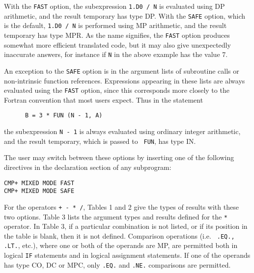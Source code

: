\noindent
With the {\tt FAST} option, the subexpression {\tt 1.D0 / N} is
evaluated using DP arithmetic, and the result temporary has type DP.
With the {\tt SAFE} option, which is the default, {\tt 1.D0 / N} is
performed using MP arithmetic, and the result temporary has type MPR.
As the name signifies, the {\tt FAST} option produces somewhat more
efficient translated code, but it may also give unexpectedly
inaccurate answers, for instance if {\tt N} in the above example has
the value 7.

An exception to the {\tt SAFE} option is in the argument lists of
subroutine calls or non-intrinsic function references.  Expressions
appearing in these lists are always evaluated using the {\tt FAST}
option, since this corresponds more closely to the Fortran convention
that most users expect.  Thus in the statement

\begin{tt} \begin{small} \begin{verbatim}
      B = 3 * FUN (N - 1, A)
\end{verbatim} \end{small} \end{tt}

\noindent
the subexpression {\tt N - 1} is always evaluated using ordinary
integer arithmetic, and the result temporary, which is passed to {\tt
FUN}, has type IN.

The user may switch between these options by inserting one of the
following directives in the declaration section of any subprogram:

\begin{tt} \begin{small} \begin{verbatim}
CMP+ MIXED MODE FAST
CMP+ MIXED MODE SAFE
\end{verbatim} \end{small} \end{tt}

For the operators {\tt + - * /}, Tables 1 and 2 give the types of
results with these two options.  Table 3 lists the argument types and
results defined for the {\tt **} operator.  In Table 3, if a
particular combination is not listed, or if its position in the table
is blank, then it is not defined.  Comparison operations (i.e. {\tt
.EQ., .LT.}, etc.), where one or both of the operands are MP, are
permitted both in logical {\tt IF} statements and in logical
assignment statements.  If one of the operands has type CO, DC or MPC,
only {\tt .EQ.} and {\tt .NE.} comparisons are permitted.
 
